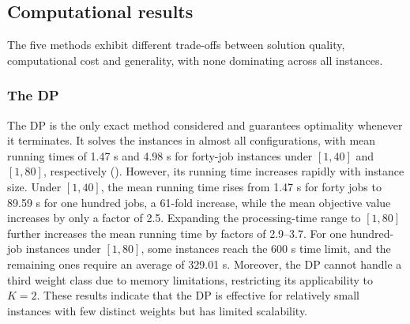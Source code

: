 ﻿\documentclass[12pt]{article} \textheight=24.5cm \textwidth=16.5cm \parskip = 0.165cm
\begin{document}
\begin{sloppypar}
        \subsection{Computational results} \label{sec:results}

        The five methods exhibit different trade-offs between solution quality, computational cost and generality, with none dominating across all instances.


        \subsubsection{The DP} \label{sec:results_dp}

        The $\mathrm{DP}$ is the only exact method considered and guarantees optimality whenever it terminates.
        It solves the instances in almost all configurations, with mean running times of 1.47 s and 4.98 s for forty-job instances under $[1,40]$ and $[1,80]$, respectively ().
        However, its running time increases rapidly with instance size.
        Under $[1,40]$, the mean running time rises from 1.47 s for forty jobs to 89.59 s for one hundred jobs, a 61-fold increase, while the mean objective value increases by only a factor of 2.5.
        Expanding the processing-time range to $[1,80]$ further increases the mean running time by factors of 2.9--3.7.
        For one hundred-job instances under $[1,80]$, some instances reach the 600 s time limit, and the remaining ones require an average of 329.01 s.
        Moreover, the $\mathrm{DP}$ cannot handle a third weight class due to memory limitations, restricting its applicability to $K=2$.
        These results indicate that the $\mathrm{DP}$ is effective for relatively small instances with few distinct weights but has limited scalability.


\end{sloppypar}
\end{document}
